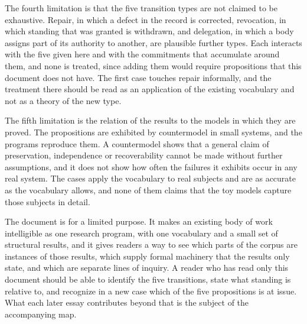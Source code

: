 The fourth limitation is that the five transition types are not claimed to be exhaustive. Repair, in which a defect in the record is corrected, revocation, in which standing that was granted is withdrawn, and delegation, in which a body assigns part of its authority to another, are plausible further types. Each interacts with the five given here and with the commitments that accumulate around them, and none is treated, since adding them would require propositions that this document does not have. The first case touches repair informally, and the treatment there should be read as an application of the existing vocabulary and not as a theory of the new type.

The fifth limitation is the relation of the results to the models in which they are proved. The propositions are exhibited by countermodel in small systems, and the programs reproduce them. A countermodel shows that a general claim of preservation, independence or recoverability cannot be made without further assumptions, and it does not show how often the failures it exhibits occur in any real system. The cases apply the vocabulary to real subjects and are as accurate as the vocabulary allows, and none of them claims that the toy models capture those subjects in detail.

The document is for a limited purpose. It makes an existing body of work intelligible as one research program, with one vocabulary and a small set of structural results, and it gives readers a way to see which parts of the corpus are instances of those results, which supply formal machinery that the results only state, and which are separate lines of inquiry. A reader who has read only this document should be able to identify the five transitions, state what standing is relative to, and recognize in a new case which of the five propositions is at issue. What each later essay contributes beyond that is the subject of the accompanying map.
